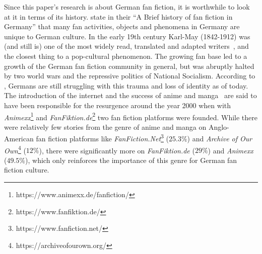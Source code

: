 Since this paper's research is about German fan fiction, it is worthwhile to look at it in terms of its history.
\citet{Cuntz-Leng2015AGermany} state in their ``A Brief history of fan fiction in Germany'' that many fan activities, objects and phenomena in Germany are unique to German culture.
In the early 19th century Karl-May (1842-1912) was (and still is) one of the most widely read, translated and adapted writers~\citep{Petzel2002DasAbenteuer-Mythos}, and the closest thing to a pop-cultural phenomenon.
The growing fan base led to a growth of the German fan fiction community in general, but was abruptly halted by two world wars and the repressive politics of National Socialism.
According to \citet{Odin2008TownsIdentity}, Germans are still struggling with this trauma and loss of identity as of today.
The introduction of the internet and the success of anime and manga~\citep{Malone2010FromEconomically} are said to have been responsible for the resurgence around the year 2000 when with \emph{Animexx}\footnote{https://www.animexx.de/fanfiction/} and \emph{FanFiktion.de}\footnote{https://www.fanfiktion.de/} two fan fiction platforms were founded.
While there were relatively few stories from the genre of anime and manga on Anglo-American fan fiction platforms like \emph{FanFiction.Net}\footnote{https://www.fanfiction.net/} ($25.3\%$) and \emph{Archive of Our Own}\footnote{https://archiveofourown.org/} ($12\%$), there were significantly more on \emph{FanFiktion.de} ($29\%$) and \emph{Animexx} ($49.5\%$), which only reinforces the importance of this genre for German fan fiction culture.
